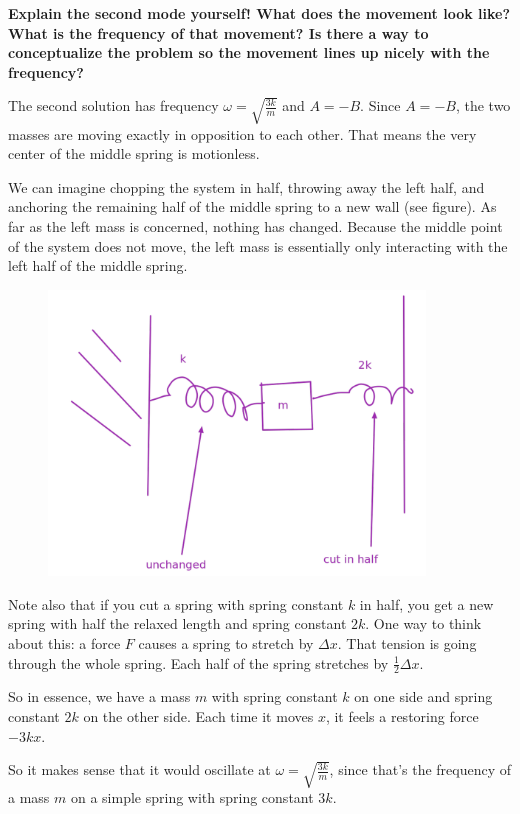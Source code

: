 \documentclass[12pt]{article}
\begin{document}
\begin{enumerate}
{\textbf{Explain the second mode yourself! What does the movement look like? What is the frequency of that movement? Is there a way to conceptualize the problem so the movement lines up nicely with the frequency?}

The second solution has frequency $\omega = \sqrt{\frac{3k}{m}}$ and $A = -B$. Since $A=-B$, the two masses are moving exactly in opposition to each other. That means the very center of the middle spring is motionless.

We can imagine chopping the system in half, throwing away the left half, and anchoring the remaining half of the middle spring to a new wall (see figure). As far as the left mass is concerned, nothing has changed. Because the middle point of the system does not move, the left mass is essentially only interacting with the left half of the middle spring. 

\begin{figure}[h]
\includegraphics[width=10cm]{coupled-oscillators-chopped.png}
\centering
\end{figure}

Note also that if you cut a spring with spring constant $k$ in half, you get a new spring with half the relaxed length and spring constant $2k$. One way to think about this: a force $F$ causes a spring to stretch by $\Delta x$. That tension is going through the whole spring. Each half of the spring stretches by $\tfrac{1}{2} \Delta x$.

So in essence, we have a mass $m$ with spring constant $k$ on one side and spring constant $2k$ on the other side. Each time it moves $x$, it feels a restoring force $-3kx$. 

So it makes sense that it would oscillate at $\omega = \sqrt{\frac{3k}{m}}$, since that's the frequency of a mass $m$ on a simple spring with spring constant $3k$.


}

\end{enumerate}
\end{document}

